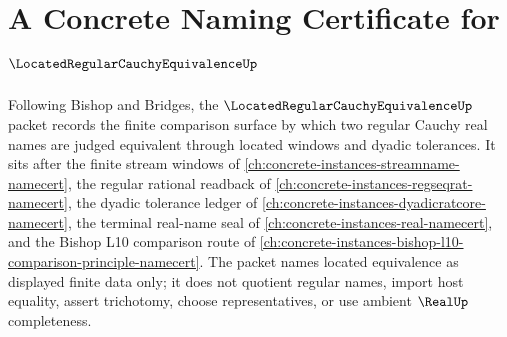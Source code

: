 \chapter{A Concrete Naming Certificate for $\LocatedRegularCauchyEquivalenceUp$}
\label{ch:concrete-instances-located-regular-cauchy-equivalence-namecert}

Following Bishop and Bridges, the $\LocatedRegularCauchyEquivalenceUp$ packet records the finite comparison surface by which two regular Cauchy real names are judged equivalent through located windows and dyadic tolerances. It sits after the finite stream windows of \autoref{ch:concrete-instances-streamname-namecert}, the regular rational readback of \autoref{ch:concrete-instances-regseqrat-namecert}, the dyadic tolerance ledger of \autoref{ch:concrete-instances-dyadicratcore-namecert}, the terminal real-name seal of \autoref{ch:concrete-instances-real-namecert}, and the Bishop L10 comparison route of \autoref{ch:concrete-instances-bishop-l10-comparison-principle-namecert}. The packet names located equivalence as displayed finite data only; it does not quotient regular names, import host equality, assert trichotomy, choose representatives, or use ambient $\RealUp$ completeness.

